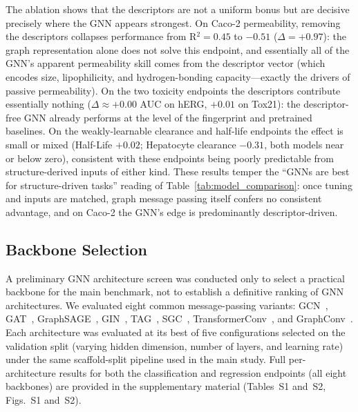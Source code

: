 \documentclass[journal]{IEEEtran}
\begin{document}
The ablation shows that the descriptors are not a uniform bonus but are decisive precisely where the GNN appears strongest. On Caco-2 permeability, removing the descriptors collapses performance from R$^2 = 0.45$ to $-0.51$ ($\Delta = +0.97$): the graph representation alone does not solve this endpoint, and essentially all of the GNN's apparent permeability skill comes from the descriptor vector (which encodes size, lipophilicity, and hydrogen-bonding capacity---exactly the drivers of passive permeability). On the two toxicity endpoints the descriptors contribute essentially nothing ($\Delta \approx +0.00$ AUC on hERG, $+0.01$ on Tox21): the descriptor-free GNN already performs at the level of the fingerprint and pretrained baselines. On the weakly-learnable clearance and half-life endpoints the effect is small or mixed (Half-Life $+0.02$; Hepatocyte clearance $-0.31$, both models near or below zero), consistent with these endpoints being poorly predictable from structure-derived inputs of either kind. These results temper the ``GNNs are best for structure-driven tasks'' reading of Table~\ref{tab:model_comparison}: once tuning and inputs are matched, graph message passing itself confers no consistent advantage, and on Caco-2 the GNN's edge is predominantly descriptor-driven.

\subsection{Backbone Selection}
\label{sec:arch_selection}

A preliminary GNN architecture screen was conducted only to select a practical backbone for the main benchmark, not to establish a definitive ranking of GNN architectures. We evaluated eight common message-passing variants: GCN~\cite{kipf2017gcn}, GAT~\cite{velickovic2018gat}, GraphSAGE~\cite{hamilton2017graphsage}, GIN~\cite{xu2019gin}, TAG~\cite{du2018tagcn}, SGC~\cite{wu2019sgc}, TransformerConv~\cite{shi2021unimp}, and GraphConv~\cite{morris2019wlgnn}. Each architecture was evaluated at its best of five configurations selected on the validation split (varying hidden dimension, number of layers, and learning rate) under the same scaffold-split pipeline used in the main study. Full per-architecture results for both the classification and regression endpoints (all eight backbones) are provided in the supplementary material (Tables~S1 and~S2, Figs.~S1 and~S2).
\end{document}

